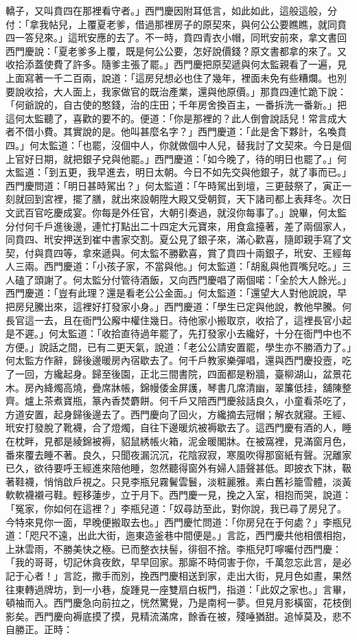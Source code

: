 轎子，又叫賁四在那裡看守者。」西門慶因附耳低言，如此如此，這般這般，分付：「拿我帖兒，上覆夏老爹，借過那裡房子的原契來，與何公公要瞧瞧，就同賁四一答兒來。」這玳安應的去了。不一時，賁四青衣小帽，同玳安前來，拿文書回西門慶說：「夏老爹多上覆，既是何公公要，怎好說價錢？原文書都拿的來了。又收拾添蓋使費了許多。隨爹主張了罷。」西門慶把原契遞與何太監親看了一遍，見上面寫著一千二百兩，說道：「這房兒想必也住了幾年，裡面未免有些糟爛。也別要說收拾，大人面上，我家做官的既治產業，還與他原價。」那賁四連忙跪下說：「何爺說的，自古使的憨錢，治的庄田；千年房舍換百主，一番拆洗一番新。」把這何太監聽了，喜歡的要不的。便道：「你是那裡的？此人倒會說話兒！常言成大者不借小費。其實說的是。他叫甚麼名字？」西門慶道：「此是舍下夥計，名喚賁四。」何太監道：「也罷，沒個中人，你就做個中人兒，替我討了文契來。今日是個上官好日期，就把銀子兌與他罷。」西門慶道：「如今晚了，待的明日也罷了。」何太監道：「到五更，我早進去，明日太朝。今日不如先交與他銀子，就了事而已。」西門慶問道：「明日甚時駕出？」何太監道：「午時駕出到壇，三更鼓祭了，寅正一刻就回到宮裡，擺了膳，就出來設朝陞大殿又受朝賀，天下諸司都上表拜冬。次日文武百官吃慶成宴。你每是外任官，大朝引奏過，就沒你每事了。」說畢，何太監分付何千戶進後邊，連忙打點出二十四定大元寶來，用食盒擡著，差了兩個家人，同賁四、玳安押送到崔中書家交割。夏公見了銀子來，滿心歡喜，隨即親手寫了文契，付與賁四等，拿來遞與。何太監不勝歡喜，賞了賁四十兩銀子，玳安、王經每人三兩。西門慶道：「小孩子家，不當與他。」何太監道：「胡亂與他買嘴兒吃。」三人磕了頭謝了。何太監分付管待酒飯，又向西門慶唱了兩個喏：「全於大人餘光。」西門慶道：「豈有此理？還是看老公公金面。」何太監道：「還望大人對他說說，早把房兒騰出來，這裡好打發家小身。」西門慶道：「學生已定與他說，教他早騰。何長官這一去，且在衙門公廨中權住幾日。待他家小搬取京，收拾了，這裡長官小起是不遲。」何太監道：「收拾直待過年罷了，先打發家小去纔好，十分在衙門中也不方便。」說話之間，已有二更天氣，說道：「老公公請安置罷，學生亦不勝酒力了。」何太監方作辭，歸後邊暖房內宿歇去了。何千戶教家樂彈唱，還與西門慶投壼，吃了一回，方纔起身。歸至後園，正北三間書院，四面都是粉牆，臺柳湖山，盆景花木。房內絳燭高燒，疊席牀帳，錦幔倭金屏護，琴書几席清幽，翠簾低挂，舖陳整齊。爐上茶煮寶瓶，篆內香焚麝餅。何千戶又陪西門慶敍話良久，小童看茶吃了，方道安置，起身歸後邊去了。西門慶向了回火，方纔摘去冠帽；解衣就寢。王經、玳安打發脫了靴襪，合了燈燭，自往下邊暖炕被褥歇去了。這西門慶有酒的人，睡在枕畔，見都是綾錦被褥，貂鼠綉帳火箱，泥金暖閣牀。在被窩裡，見滿窗月色，番來覆去睡不著。良久，只聞夜漏沉沉，花陰寂寂，寒風吹得那窗紙有聲。況離家已久，欲待要呼王經進來陪他睡，忽然聽得窗外有婦人語聲甚低。即披衣下牀，靸著鞋襪，悄悄啟戶視之。只見李瓶兒霧鬢雲鬟，淡粧麗雅。素白舊衫籠雪體，淡黃軟軟襪襯弓鞋。輕移蓮步，立于月下。西門慶一見，挽之入室，相抱而哭，說道：「冤家，你如何在這裡？」李瓶兒道：「奴尋訪至此，對你說，我已尋了房兒了。今特來見你一面，早晚便搬取去也。」西門慶忙問道：「你房兒在于何處？」李瓶兒道：「咫尺不遠，出此大街，迤東造釜巷中間便是。」言訖，西門慶共他相偎相抱，上牀雲雨，不勝美快之極。已而整衣扶髻，徘徊不捨。李瓶兒叮嚀囑付西門慶：「我的哥哥，切記休貪夜飲，早早回家。那廝不時伺害于你，千萬忽忘此言，是必記于心者！」言訖，撒手而別，挽西門慶相送到家，走出大街，見月色如晝，果然往東轉過牌坊，到一小巷，旋踵見一座雙扇白板門，指道：「此奴之家也。」言畢，頓袖而入。西門慶急向前拉之，恍然驚覺，乃是南柯一夢。但見月影橫窗，花枝倒影矣。西門慶向褥底摸了摸，見精流滿席，餘香在被，殘唾猶甜。追悼莫及，悲不自勝正。正時：

